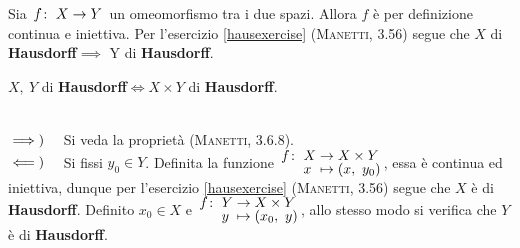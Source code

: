 \begin{demonstration}
	Sia $\funz{f}{X}{Y}$ un omeomorfismo tra i due spazi. Allora $f$ è per definizione continua e iniettiva. Per l'esercizio \ref{hausexercise} \textsc{(Manetti, 3.56)} segue che $X$ di \textbf{Hausdorff}$\implies$ Y di \textbf{Hausdorff}.
\end{demonstration}
\begin{theorema}
	$X,\ Y$ di \textbf{Hausdorff}$\iff X\times Y$ di \textbf{Hausdorff}.
\end{theorema}
\begin{demonstration}~{}\\
	$\implies)\quad$ Si veda la proprietà \label{prodottihause} \textsc{(Manetti, 3.6.8)}.\\
	$\impliedby)\quad$ Si fissi $y_0\in Y$. Definita la funzione $\funztot{f}{X}{X\times Y}{x}{\left(x,\ y_0\right)}$, essa è continua ed iniettiva, dunque per l'esercizio \ref{hausexercise} \textsc{(Manetti, 3.56)} segue che $X$ è di \textbf{Hausdorff}. Definito $x_0\in X$ e $\funztot{f}{Y}{X\times Y}{y}{\left(x_0,\ y\right)}$, allo stesso modo si verifica che $Y$ è di \textbf{Hausdorff}.
\end{demonstration}